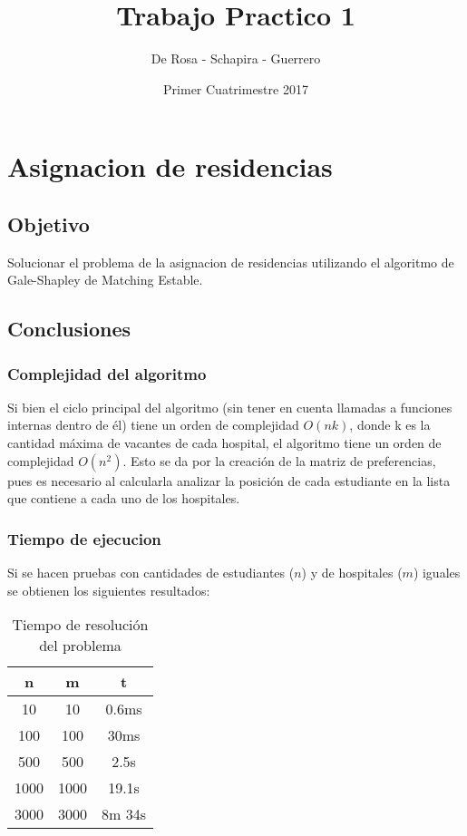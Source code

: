 \documentclass{article}
\title{Trabajo Practico 1}
\author{De Rosa - Schapira - Guerrero}
\date{Primer Cuatrimestre 2017}
\begin{document}
    \maketitle
    \newpage
    \tableofcontents
    \newpage

    \section{Asignacion de residencias}
        \subsection{Objetivo}
            Solucionar el problema de la asignacion de residencias utilizando
            el algoritmo de Gale-Shapley de Matching Estable.
        \subsection{Conclusiones}
            \subsubsection{Complejidad del algoritmo}
                Si bien el ciclo principal del algoritmo (sin tener en cuenta
                llamadas a funciones internas dentro de él) tiene un orden de complejidad
                $O(nk)$, donde k es la cantidad máxima de vacantes de cada hospital,
                el algoritmo tiene un orden de complejidad $O(n^2)$. Esto se da por la
                creación de la matriz de preferencias, pues es necesario al calcularla analizar
                la posición de cada estudiante en la lista que contiene a cada uno de los hospitales.
            \subsubsection{Tiempo de ejecucion}
                Si se hacen pruebas con cantidades de estudiantes ($n$) y de hospitales
                ($m$) iguales se obtienen los siguientes resultados:
                \begin{table}[h!]
                    \centering
                    \caption{Tiempo de resolución del problema}
                    \begin{tabular}{c|c|c}
                        n & m & t \\
                        \hline
                        10 & 10 & 0.6ms \\
                        \hline
                        100 & 100 & 30ms \\
                        \hline
                        500 & 500 & 2.5s \\
                        \hline
                        1000 & 1000 & 19.1s \\
                        \hline
                        3000 & 3000 & 8m 34s
                    \end{tabular}
                \end{table}
\end{document}
